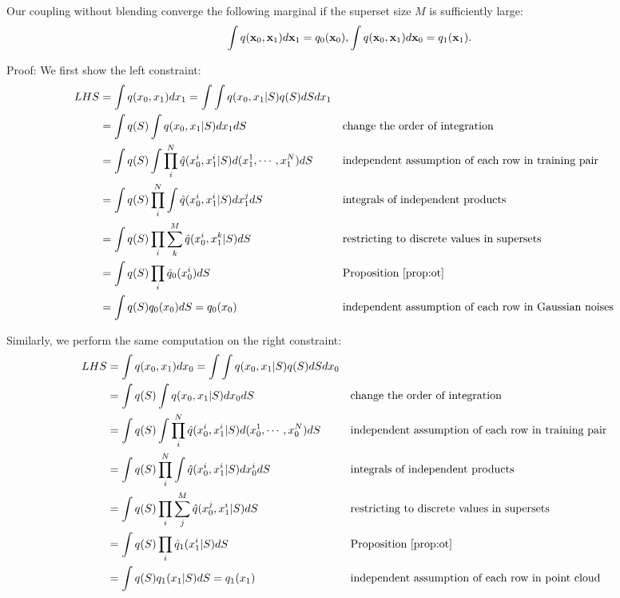 \begin{theorem}


Our coupling without blending converge the following marginal if the superset size $M$ is sufficiently large:
\begin{equation}\label{eq:mariginals}
    \int q({\mathbf{x}}_0, {\mathbf{x}}_1) d{\mathbf{x}}_1 = q_0({\mathbf{x}}_0), \int q({\mathbf{x}}_0, {\mathbf{x}}_1) d{\mathbf{x}}_0 = q_1({\mathbf{x}}_1).
\end{equation}
\end{theorem}

Proof:
We first show the left constraint:
\begin{align}
LHS & = \int q(x_0, x_1) dx_1 = \int \int q(x_0, x_1 | S) q(S) dS dx_1  \\
& = \int q(S) \int q(x_0, x_1 | S) dx_1 dS && \text{change the order of integration} \\
& = \int q(S) \int \prod_i^N \hat{q}(x_0^i, x_1^i|S) d(x_1^1, \cdots, x_1^N) dS  && \text{independent assumption of each row in training pair}\\
& = \int q(S) \prod_i^N \int \hat{q}(x_0^i, x_1^i|S) dx_1^j dS && \text{integrals of independent products}\\
& = \int q(S) \prod_i \sum_k^M \hat{q}(x_0^i, x_1^k|S) dS && \text{restricting to discrete values in supersets}\\
& = \int q(S) \prod_i \hat{q}_0(x^i_0) dS && \text{Proposition~\ref{prop:ot}}\\
& = \int q(S) q_0(x_0) dS = q_0(x_0) && \text{independent assumption of each row in Gaussian noises} \\
\end{align}

Similarly, we perform the same computation on the right constraint:
\begin{align}
LHS & = \int q(x_0, x_1) dx_0 = \int \int q(x_0, x_1 | S) q(S) dS dx_0   \\
 & = \int q(S) \int q(x_0, x_1 | S) dx_0 dS && \text{change the order of integration} \\
& = \int q(S) \int \prod_i^N \hat{q}(x_0^i, x_1^i|S) d(x_0^1, \cdots, x_0^N) dS && \text{independent assumption of each row in training pair} \\
& = \int q(S) \prod_i^N \int \hat{q}(x_0^i, x_1^i|S) dx_0^i dS  && \text{integrals of independent products} \\
& = \int q(S) \prod_i \sum_j^M \hat{q}(x_0^j, x_1^i|S) dS 
 && \text{restricting to discrete values in supersets} \\
& = \int q(S) \prod_i \hat{q}_1(x^i_1 | S) dS  && \text{Proposition~\ref{prop:ot}} \\
& = \int q(S) q_1(x_1 | S) dS = q_1(x_1) && \text{independent assumption of each row in point cloud} \\
\end{align}


